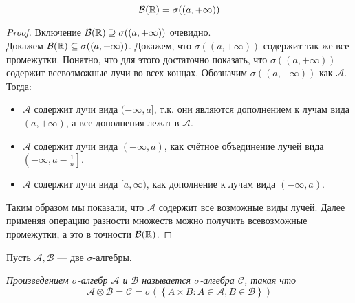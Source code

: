 \begin{proposal}
    \[
        \mathcal{B}(\mathbb{R}) = \sigma((a, +\infty))
    \]
\end{proposal}
\begin{proof}
    Включение $\mathcal{B}(\mathbb{R}) \supseteq \sigma((a, +\infty))$ очевидно.\\
    Докажем $\mathcal{B}(\mathbb{R}) \subseteq \sigma((a, +\infty))$.
    Докажем, что $\sigma((a, +\infty))$ содержит так же все промежутки. Понятно, что для этого достаточно
    показать, что $\sigma((a, +\infty))$ содержит всевозможные лучи во всех концах. Обозначим
    $\sigma((a, +\infty))$ как $\mathcal{A}$. Тогда:
    \begin{itemize}
        \item $\mathcal{A}$ содержит лучи вида $(-\infty, a]$, т.к. они являются дополнением к лучам вида
        $(a, +\infty)$, а все дополнения лежат в $\mathcal{A}$.
        \item $\mathcal{A}$ содержит лучи вида $(-\infty, a)$, как счётное объединение лучей вида
        $\left( -\infty, a - \frac{1}{n} \right]$.
        \item $\mathcal{A}$ содержит лучи вида $[a, \infty)$, как дополнение к лучам вида $(-\infty, a)$.
    \end{itemize}
    Таким образом мы показали, что $\mathcal{A}$ содержит все возможные виды лучей. Далее применяя операцию
    разности множеств можно получить всевозможные промежутки, а это в точности $\mathcal{B}(\mathbb{R})$.
\end{proof}
Пусть $\mathcal{A}, \mathcal{B}$ --- две $\sigma$-алгебры.
\begin{definition}
    \it{Произведением} $\sigma$-алгебр $\mathcal{A}$ и $\mathcal{B}$ называется $\sigma$-алгебра
    $\mathcal{C}$, такая что
    \[
        \mathcal{A} \otimes \mathcal{B} = \mathcal{C} =
        \sigma\left( \left\{ A \times B \colon A \in \mathcal{A}, B \in \mathcal{B} \right\} \right)
    \]
\end{definition}
